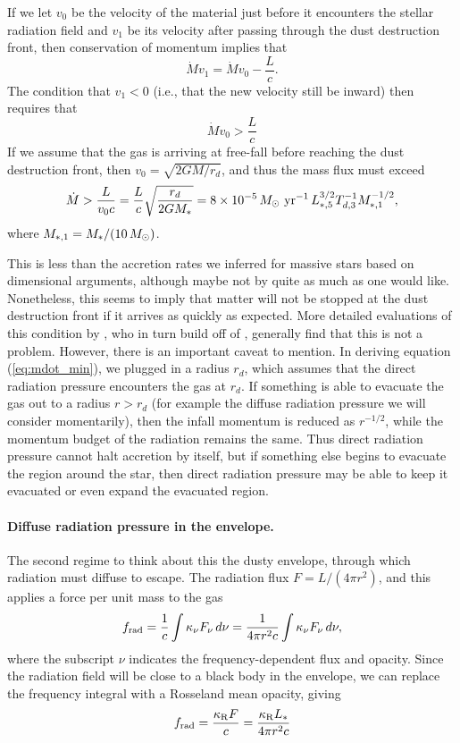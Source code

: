 If we let $v_0$ be the velocity of the material just before it encounters the stellar radiation field and $v_1$ be its velocity after passing through the dust destruction front, then conservation of momentum implies that
\begin{equation}
\dot{M} v_1 = \dot{M} v_0 - \frac{L}{c}.
\end{equation}
The condition that $v_1 < 0$ (i.e., that the new velocity still be inward) then requires that
\begin{equation}
\dot{M} v_0 > \frac{L}{c}
\end{equation}
If we assume that the gas is arriving at free-fall before reaching the dust destruction front, then $v_0 = \sqrt{2 G M/r_d}$, and thus the mass flux must exceed
\begin{equation}
\label{eq:mdot_min}
\dot{M} > \frac{L}{v_0 c} = \frac{L}{c} \sqrt{\frac{r_d}{2 G M_*}} = 8\times 10^{-5} \,\msun\mbox{ yr}^{-1} \, L_{*,5}^{3/2} T_{d,3}^{-1} M_{*,1}^{-1/2},
\end{equation}
where $M_{*,1}=M_*/(10\,M_{\odot})$.

This is less than the accretion rates we inferred for massive stars based on dimensional arguments, although maybe not by quite as much as one would like. Nonetheless, this seems to imply that matter will not be stopped at the dust destruction front if it arrives as quickly as expected. More detailed evaluations of this condition by \citet{mckee03a}, who in turn build off of \citet{wolfire87a}, generally find that this is not a problem. However, there is an important caveat to mention. In deriving equation (\ref{eq:mdot_min}), we plugged in a radius $r_d$, which assumes that the direct radiation pressure encounters the gas at $r_d$. If something is able to evacuate the gas out to a radius $r > r_d$ (for example the diffuse radiation pressure we will consider momentarily), then the infall momentum is reduced as $r^{-1/2}$, while the momentum budget of the radiation remains the same. Thus direct radiation pressure cannot halt accretion by itself, but if something else begins to evacuate the region around the star, then direct radiation pressure may be able to keep it evacuated or even expand the evacuated region.

\paragraph{Diffuse radiation pressure in the envelope.} The second regime to think about this the dusty envelope, through which radiation must diffuse to escape. The radiation flux $F=L/(4\pi r^2)$, and this applies a force per unit mass to the gas
\begin{equation}
f_{\rm rad} = \frac{1}{c} \int \kappa_{\nu} F_{\nu} \, d\nu = \frac{1}{4\pi r^2 c} \int \kappa_{\nu} F_{\nu} \, d\nu,
\end{equation}
where the subscript $\nu$ indicates the frequency-dependent flux and opacity. Since the radiation field will be close to a black body in the envelope, we can replace the frequency integral with a Rosseland mean opacity, giving
\begin{equation}
f_{\rm rad} = \frac{\kappa_{\rm R} F}{c} = \frac{\kappa_{\rm R} L_*}{4\pi r^2 c}
\end{equation}

